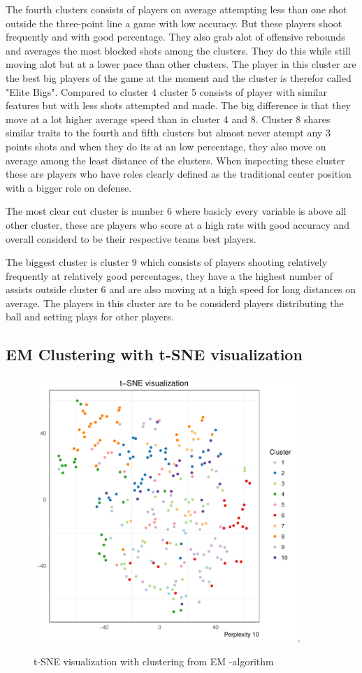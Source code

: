 \documentclass{article}
\begin{document}
The fourth clusters consists of players on average attempting less than one shot outside the three-point line a game with low accuracy. But these players shoot frequently and with good percentage. They also grab alot of offensive rebounds and averages the most blocked shots among the clusters. They do this while still moving alot but at a lower pace than other clusters. The player in this cluster are the best big players of the game at the moment and the cluster is therefor called "Elite Bigs". Compared to cluster 4 cluster 5 consists of player with similar features but with less shots attempted and made. The big difference is that they move at a lot higher average speed than in cluster 4 and 8. Cluster 8 shares similar traits to the fourth and fifth clusters but almost never atempt any 3 points shots and when they do its at an low percentage, they also move on average among the least distance of the clusters. When inspecting these cluster these are players who have roles clearly defined as the traditional center position with a bigger role on defense.

The most clear cut cluster is number 6 where basicly every variable is above all other cluster, these are players who score at a high rate with good accuracy and overall considerd to be their respective teams best players. 

The biggest cluster is cluster 9 which consists of players shooting relatively frequently at relatively good percentages, they have a the highest number of assists outside cluster 6 and are also moving at a high speed for long distances on average. The players in this cluster are to be considerd players distributing the ball and setting plays for other players.

\subsection{EM Clustering with t-SNE visualization}

\begin{figure}[H]
 \centering
 \includegraphics[height=10cm]{tsnecluster2.pdf}.
 \caption{t-SNE visualization with clustering from EM -algorithm}
 \label{figure:2}
\end{figure}
\end{document}
